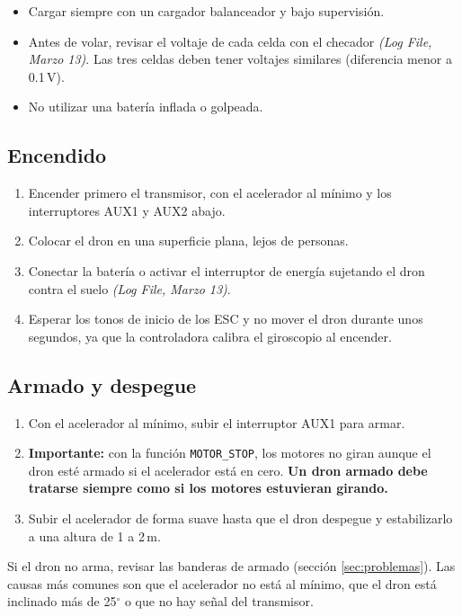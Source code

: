\documentclass[11pt,letterpaper]{article}
\newcommand{\logref}[1]{\textit{(Log File, #1)}}
\begin{document}
\begin{itemize}[nosep]
    \item Cargar siempre con un cargador balanceador y bajo supervisión.
    \item Antes de volar, revisar el voltaje de cada celda con el checador \logref{Marzo 13}. Las tres celdas deben tener voltajes similares (diferencia menor a 0.1\,V).
    \item No utilizar una batería inflada o golpeada.
\end{itemize}

\subsection{Encendido}
\begin{enumerate}[nosep]
    \item Encender primero el transmisor, con el acelerador al mínimo y los interruptores AUX1 y AUX2 abajo.
    \item Colocar el dron en una superficie plana, lejos de personas.
    \item Conectar la batería o activar el interruptor de energía sujetando el dron contra el suelo \logref{Marzo 13}.
    \item Esperar los tonos de inicio de los ESC y no mover el dron durante unos segundos, ya que la controladora calibra el giroscopio al encender.
\end{enumerate}

\subsection{Armado y despegue}
\begin{enumerate}[nosep]
    \item Con el acelerador al mínimo, subir el interruptor AUX1 para armar.
    \item \textbf{Importante:} con la función \texttt{MOTOR\_STOP}, los motores no giran aunque el dron esté armado si el acelerador está en cero. \textbf{Un dron armado debe tratarse siempre como si los motores estuvieran girando.}
    \item Subir el acelerador de forma suave hasta que el dron despegue y estabilizarlo a una altura de 1 a 2\,m.
\end{enumerate}
Si el dron no arma, revisar las banderas de armado (sección \ref{sec:problemas}). Las causas más comunes son que el acelerador no está al mínimo, que el dron está inclinado más de 25$^{\circ}$ o que no hay señal del transmisor.
\end{document}
